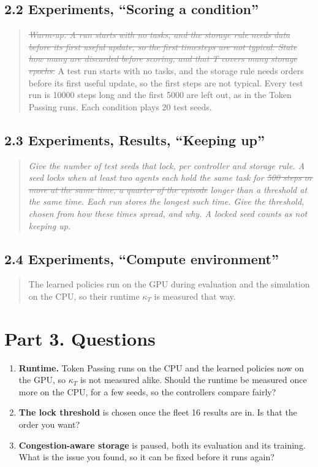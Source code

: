 \documentclass[11pt,a4paper]{article}
\newcommand{\new}[1]{\textcolor{newc}{#1}}
\newcommand{\old}[1]{\textcolor{gray}{\st{#1}}}
\newcommand{\mockup}[1]{\textit{#1}}
\begin{document}
\subsection*{2.2 Experiments, ``Scoring a condition''}
\begin{quote}
\textit{\old{Warm-up. A run starts with no tasks, and the storage rule needs data before its first useful update, so the first timesteps are not typical. State how many are discarded before scoring, and that T covers many storage epochs.}}
\new{A test run starts with no tasks, and the storage rule needs orders before
its first useful update, so the first steps are not typical. Every test run is
10000 steps long and the first 5000 are left out, as in the Token Passing runs.
Each condition plays 20 test seeds.}
\end{quote}

\subsection*{2.3 Experiments, Results, ``Keeping up''}
\begin{quote}
\mockup{Give the number of test seeds that lock, per controller and storage
rule. A seed locks when at least two agents each hold the same task for
\old{500 steps or more at the same time, a quarter of the episode}
\new{longer than a threshold at the same time. Each run stores the longest
such time. Give the threshold, chosen from how these times spread, and why}.
A locked seed counts as not keeping up.}
\end{quote}

\subsection*{2.4 Experiments, ``Compute environment''}
\begin{quote}
\new{The learned policies run on the GPU during evaluation and the simulation
on the CPU, so their runtime $\kappa_T$ is measured that way.}
\end{quote}

\section*{Part 3. Questions}
\begin{enumerate}[leftmargin=1.4em]
\item \textbf{Runtime.} Token Passing runs on the CPU and the learned
policies now on the GPU, so $\kappa_T$ is not measured alike. Should the
runtime be measured once more on the CPU, for a few seeds, so the
controllers compare fairly?
\item \textbf{The lock threshold} is chosen once the fleet 16 results are in.
Is that the order you want?
\item \textbf{Congestion-aware storage} is paused, both its evaluation and
its training. What is the issue you found, so it can be fixed before it runs
again?
\end{enumerate}
\end{document}
